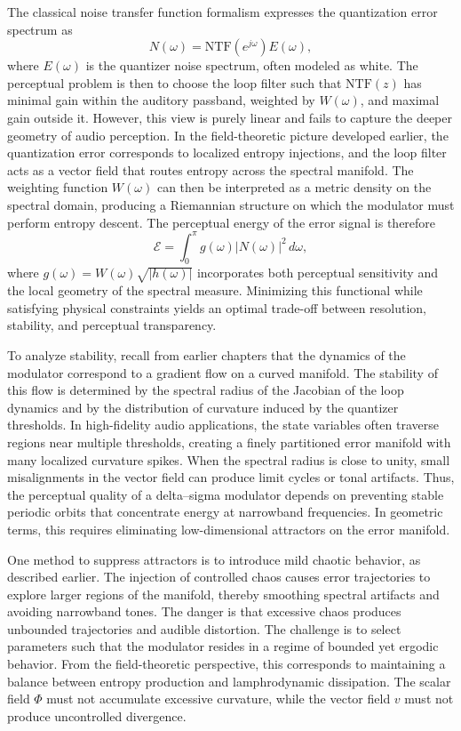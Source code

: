 The classical noise transfer function formalism expresses the quantization error spectrum as
\[
N(\omega) = \mathrm{NTF}(e^{j\omega}) E(\omega),
\]
where \(E(\omega)\) is the quantizer noise spectrum, often modeled as white. The perceptual problem is then to choose the loop filter such that \( \mathrm{NTF}(z) \) has minimal gain within the auditory passband, weighted by \(W(\omega)\), and maximal gain outside it. However, this view is purely linear and fails to capture the deeper geometry of audio perception. In the field-theoretic picture developed earlier, the quantization error corresponds to localized entropy injections, and the loop filter acts as a vector field that routes entropy across the spectral manifold. The weighting function \(W(\omega)\) can then be interpreted as a metric density on the spectral domain, producing a Riemannian structure on which the modulator must perform entropy descent. The perceptual energy of the error signal is therefore
\[
\mathcal{E} = \int_{0}^{\pi} g(\omega) |N(\omega)|^{2} \, d\omega,
\]
where \(g(\omega) = W(\omega) \sqrt{|h(\omega)|}\) incorporates both perceptual sensitivity and the local geometry of the spectral measure. Minimizing this functional while satisfying physical constraints yields an optimal trade-off between resolution, stability, and perceptual transparency.

To analyze stability, recall from earlier chapters that the dynamics of the modulator correspond to a gradient flow on a curved manifold. The stability of this flow is determined by the spectral radius of the Jacobian of the loop dynamics and by the distribution of curvature induced by the quantizer thresholds. In high-fidelity audio applications, the state variables often traverse regions near multiple thresholds, creating a finely partitioned error manifold with many localized curvature spikes. When the spectral radius is close to unity, small misalignments in the vector field can produce limit cycles or tonal artifacts. Thus, the perceptual quality of a delta--sigma modulator depends on preventing stable periodic orbits that concentrate energy at narrowband frequencies. In geometric terms, this requires eliminating low-dimensional attractors on the error manifold.

One method to suppress attractors is to introduce mild chaotic behavior, as described earlier. The injection of controlled chaos causes error trajectories to explore larger regions of the manifold, thereby smoothing spectral artifacts and avoiding narrowband tones. The danger is that excessive chaos produces unbounded trajectories and audible distortion. The challenge is to select parameters such that the modulator resides in a regime of bounded yet ergodic behavior. From the field-theoretic perspective, this corresponds to maintaining a balance between entropy production and lamphrodynamic dissipation. The scalar field \(\Phi\) must not accumulate excessive curvature, while the vector field \(v\) must not produce uncontrolled divergence.

